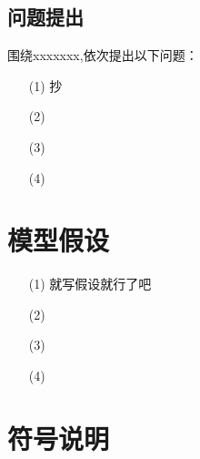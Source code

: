 \documentclass{whutmod}
\begin{document}
	\subsection{问题提出}
	
	围绕xxxxxxx,依次提出以下问题：
	
	\begin{itemize}
		\item [(1)]
		 抄
		\item [(2)] 
		\item [(3)] 
		\item [(4)] 
	\end{itemize}
	
	\section{模型假设}
	\begin{itemize}
		\item [(1)] 就写假设就行了吧
		\item [(2)] 
		\item [(3)]
		\item [(4)]
	\end{itemize}
	
	
	\section{符号说明}
\end{document}
